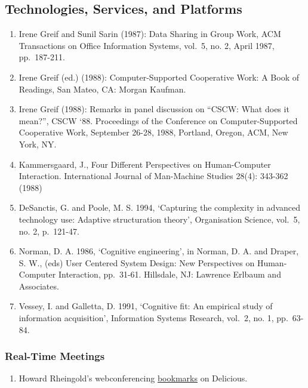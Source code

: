 \hypertarget{technologies-services-and-platforms}{%
\subsection{Technologies, Services, and
Platforms}\label{technologies-services-and-platforms}}

\begin{enumerate}
\def\labelenumi{\arabic{enumi}.}
\item
  Irene Greif and Sunil Sarin (1987): Data Sharing in Group Work, ACM
  Transactions on Office Information Systems, vol.~5, no. 2, April 1987,
  pp.~187-211.
\item
  Irene Greif (ed.) (1988): Computer-Supported Cooperative Work: A Book
  of Readings, San Mateo, CA: Morgan Kaufman.
\item
  Irene Greif (1988): Remarks in panel discussion on ``CSCW: What does
  it mean?'', CSCW `88. Proceedings of the Conference on
  Computer-Supported Cooperative Work, September 26-28, 1988, Portland,
  Oregon, ACM, New York, NY.
\item
  Kammersgaard, J., Four Different Perspectives on Human-Computer
  Interaction. International Journal of Man-Machine Studies 28(4):
  343-362 (1988)
\item
  DeSanctis, G. and Poole, M. S. 1994, `Capturing the complexity in
  advanced technology use: Adaptive structuration theory', Organisation
  Science, vol.~5, no. 2, p.~121-47.
\item
  Norman, D. A. 1986, `Cognitive engineering', in Norman, D. A. and
  Draper, S. W., (eds) User Centered System Design: New Perspectives on
  Human-Computer Interaction, pp.~31-61. Hillsdale, NJ: Lawrence Erlbaum
  and Associates.
\item
  Vessey, I. and Galletta, D. 1991, `Cognitive fit: An empirical study
  of information acquisition', Information Systems Research, vol.~2, no.
  1, pp.~63-84.
\end{enumerate}

\hypertarget{real-time-meetings}{%
\subsubsection{Real-Time Meetings}\label{real-time-meetings}}

\begin{enumerate}
\def\labelenumi{\arabic{enumi}.}
\tightlist
\item
  Howard Rheingold's webconferencing
  \href{http://delicious.com/hrheingold/webconferencing}{bookmarks} on
  Delicious.
\end{enumerate}

